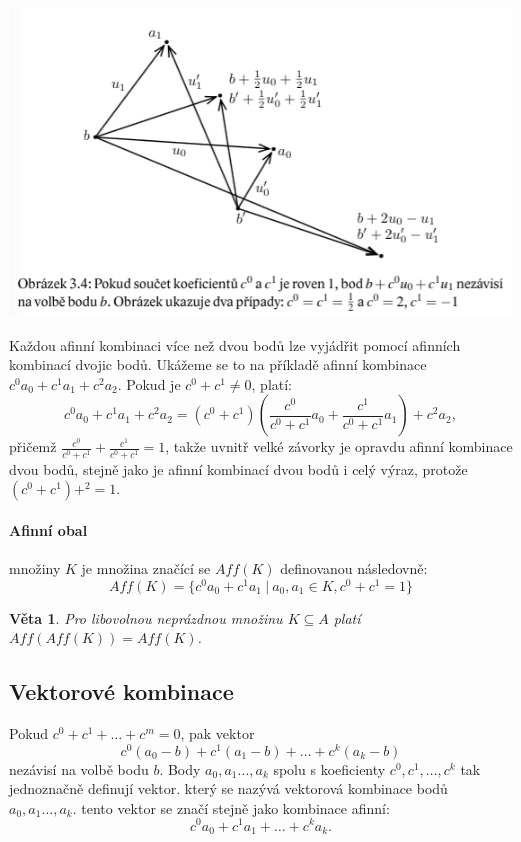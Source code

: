 \documentclass[12pt,a4paper]{article}
\newtheorem{sentence}{Věta}
\begin{document}
\includegraphics[scale=0.7]{img/AfinniObal2}

Každou afinní kombinaci více než dvou bodů lze vyjádřit pomocí afinních kombinací dvojic bodů. Ukážeme se to na příkladě afinní kombinace $c^0a_0 + c^1a_1 + c^2a_2$. Pokud je $c^0 + c^1 \not= 0$, platí: $$c^0a_0 + c^1a_1 + c^2a_2  = (c^0 + c^1) \left( \frac{c^0}{c^0 + c^1}a_0 + \frac{c^1}{c^0 + c^1}a_1 \right) + c^2a_2,$$ přičemž $\frac{c^0}{c^0 + c^1} + \frac{c^1}{c^0 + c^1} = 1$, takže uvnitř velké závorky je opravdu afinní kombinace dvou bodů, stejně jako je afinní kombinací dvou bodů i celý výraz, protože $(c^0 + c^1) + ^2 = 1$. 

\paragraph{Afinní obal} množiny $K$ je množina značící se $Aff(K)$ definovanou následovně: $$Aff(K) = \{ c^0a_0 + c^1a_1 \ | \ a_0,a_1 \in K, c^0 + c^1 = 1\}$$

\begin{sentence}
	Pro libovolnou neprázdnou množinu $K \subseteq A$ platí $Aff(Aff(K)) = Aff(K)$.
\end{sentence}

\subsection{Vektorové kombinace}
Pokud $c^0 + c^1 + \dots + c^m = 0$, pak vektor $$c^0(a_0 - b) + c^1(a_1 - b) + \dots + c^k(a_k - b)$$nezávisí na volbě bodu $b$. Body $a_0,a_1 \dots, a_k$ spolu s koeficienty $c^0,c^1, \dots, c^k$ tak jednoznačně definují vektor. který se nazývá vektorová kombinace bodů $a_0,a_1 \dots, a_k$. tento vektor se značí stejně jako kombinace afinní: $$c^0a_0 + c^1a_1 + \dots + c^ka_k.$$
\end{document}

